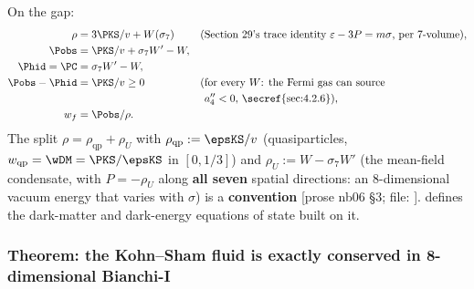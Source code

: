 On the gap:
\begin{align*}
  \rho&=3\PKS/v+W(\sigma_7) &&\text{(Section~29's trace identity $\varepsilon-3P=m\sigma$, per 7-volume)},\\
  \Pobs&=\PKS/v+\sigma_7W'-W,\\
  \Phid=\PC&=\sigma_7W'-W,\\
  \Pobs-\Phid&=\PKS/v\geq0 &&\text{(for every $W$: the Fermi gas can source}\\
  & &&\text{\phantom{(}$a_4''<0$, \secref{sec:4.2.6})},\\
  w_f&=\Pobs/\rho .
\end{align*}
The split $\rho=\rho_{\mathrm{qp}}+\rho_U$ with $\rho_{\mathrm{qp}}:=\epsKS/v$ (quasiparticles,
$w_{\mathrm{qp}}=\wDM=\PKS/\epsKS$ in $[0,1/3]$) and $\rho_U:=W-\sigma_7W'$ (the mean-field condensate,
with $P=-\rho_U$ along \textbf{all seven} spatial directions: an 8-dimensional vacuum energy that varies
with $\sigma$) is a \textbf{convention} [prose nb06 \S3; file: ].
 defines the dark-matter and dark-energy equations of state built on it.

\subsubsection{Theorem: the Kohn--Sham fluid is exactly conserved in 8-dimensional Bianchi-I}
\label{sec:4.5.5}

